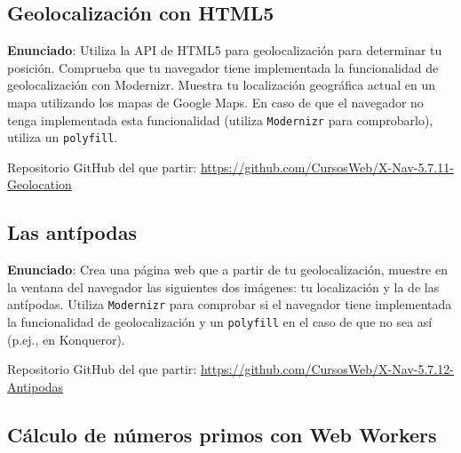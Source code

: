\subsection{Geolocalización con HTML5}
\label{subsec:geolocalizacion}

\textbf{Enunciado}: Utiliza la API de HTML5 para geolocalización para determinar tu posición. Comprueba que tu navegador tiene implementada la funcionalidad de geolocalización con Modernizr. Muestra tu localización geográfica actual en un mapa utilizando los mapas de Google Maps. En caso de que el navegador no tenga implementada esta funcionalidad (utiliza \texttt{Modernizr} para comprobarlo), utiliza un \texttt{polyfill}.

Repositorio GitHub del que partir: \url{https://github.com/CursosWeb/X-Nav-5.7.11-Geolocation}

\subsection{Las antípodas}
\label{subsec:antipodas}

\textbf{Enunciado}: Crea una página web que a partir de tu geolocalización, muestre en la ventana del navegador las siguientes dos imágenes: tu localización y la de las antípodas. Utiliza \texttt{Modernizr} para comprobar si el navegador tiene implementada la funcionalidad de geolocalización y un \texttt{polyfill} en el caso de que no sea así (p.ej., en Konqueror).


Repositorio GitHub del que partir: \url{https://github.com/CursosWeb/X-Nav-5.7.12-Antipodas}


\subsection{Cálculo de números primos con Web Workers}
\label{subsec:webworker-primos}

